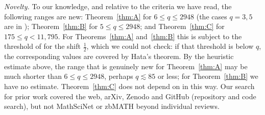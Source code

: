 \documentclass[11pt]{amsart}
\theoremstyle{definition}
\theoremstyle{remark}
\numberwithin{equation}{section}
\begin{document}
\emph{Novelty.} To our knowledge, and relative to the criteria we have read, the following ranges are new:
Theorem~\ref{thm:A} for $6\le q\le2948$ (the cases $q=3,5$ are in \cite{Chi2Paper}); Theorem~\ref{thm:B} for
$5\le q\le2948$; and Theorem~\ref{thm:C} for $175\le q<11{,}795$. For Theorems~\ref{thm:A} and~\ref{thm:B} this is
subject to the threshold of \cite{Hata1990} for the shift $\frac12$, which we could not check: if that threshold is
below $q$, the corresponding values are covered by Hata's theorem. By the heuristic estimate above, the range that is
genuinely new for Theorem~\ref{thm:A} may be much shorter than $6\le q\le2948$, perhaps $q\lesssim85$ or less; for
Theorem~\ref{thm:B} we have no estimate. Theorem~\ref{thm:C} does not depend on \cite{Hata1990} in this way.
Our search for prior work covered the web, arXiv, Zenodo and GitHub (repository and code search), but not MathSciNet
or zbMATH beyond individual reviews.
\end{document}

